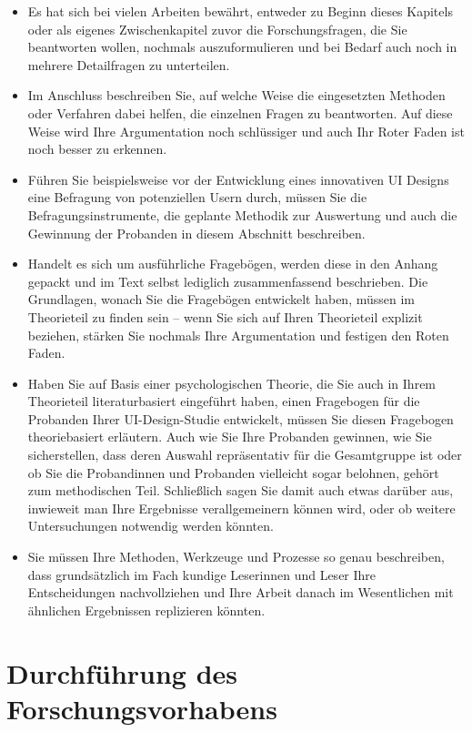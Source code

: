 \documentclass{article}
\begin{document}
\begin{itemize}
    \item Es hat sich bei vielen Arbeiten bewährt, entweder zu Beginn dieses Kapitels oder als eigenes Zwischenkapitel zuvor die Forschungsfragen, die Sie beantworten wollen, nochmals auszuformulieren und bei Bedarf auch noch in mehrere Detailfragen zu unterteilen.
    \item Im Anschluss beschreiben Sie, auf welche Weise die eingesetzten Methoden oder Verfahren dabei helfen, die einzelnen Fragen zu beantworten. Auf diese Weise wird Ihre Argumentation noch schlüssiger und auch Ihr Roter Faden ist noch besser zu erkennen.
    \item Führen Sie beispielsweise vor der Entwicklung eines innovativen UI Designs eine Befragung von potenziellen Usern durch, müssen Sie die Befragungsinstrumente, die geplante Methodik zur Auswertung und auch die Gewinnung der Probanden in diesem Abschnitt beschreiben.
    \item Handelt es sich um ausführliche Fragebögen, werden diese in den Anhang gepackt und im Text selbst lediglich zusammenfassend beschrieben. Die Grundlagen, wonach Sie die Fragebögen entwickelt haben, müssen im Theorieteil zu finden sein – wenn Sie sich auf Ihren Theorieteil explizit beziehen, stärken Sie nochmals Ihre Argumentation und festigen den Roten Faden.
    \item Haben Sie auf Basis einer psychologischen Theorie, die Sie auch in Ihrem Theorieteil literaturbasiert eingeführt haben, einen Fragebogen für die Probanden Ihrer UI-Design-Studie entwickelt, müssen Sie diesen Fragebogen theoriebasiert erläutern. Auch wie Sie Ihre Probanden gewinnen, wie Sie sicherstellen, dass deren Auswahl repräsentativ für die Gesamtgruppe ist oder ob Sie die Probandinnen und Probanden vielleicht sogar belohnen, gehört zum methodischen Teil. Schließlich sagen Sie damit auch etwas darüber aus, inwieweit man Ihre Ergebnisse verallgemeinern können wird, oder ob weitere Untersuchungen notwendig werden könnten.
    \item Sie müssen Ihre Methoden, Werkzeuge und Prozesse so genau beschreiben, dass grundsätzlich im Fach kundige Leserinnen und Leser Ihre Entscheidungen nachvollziehen und Ihre Arbeit danach im Wesentlichen mit ähnlichen Ergebnissen replizieren könnten.
\end{itemize}

\section{Durchführung des Forschungsvorhabens}
\end{document}
